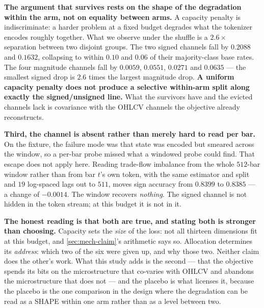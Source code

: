 \textbf{The argument that survives rests on the shape of the degradation within the arm, not on
equality between arms.} A capacity penalty is indiscriminate: a harder problem at a fixed budget
degrades what the tokenizer encodes roughly together. What we observe under the shuffle is a
$2.6\times$ separation between two disjoint groups. The two signed channels fall by $0.2088$ and
$0.1632$, collapsing to within $0.10$ and $0.06$ of their majority-class base rates. The four
magnitude channels fall by $0.0059$, $0.0551$, $0.0271$ and $0.0635$ --- the smallest signed drop
is $2.6$ times the largest magnitude drop. \textbf{A uniform capacity penalty does not produce a
selective within-arm split along exactly the signed/unsigned line.} What the survivors have and the
evicted channels lack is covariance with the OHLCV channels the objective already reconstructs.

\textbf{Third, the channel is absent rather than merely hard to read per bar.} On the fixture, the
failure mode was that state was encoded but smeared across the window, so a per-bar probe missed
what a windowed probe could find. That escape does not apply here. Reading trade-flow imbalance from
the whole $512$-bar window rather than from bar $t$'s own token, with the same estimator and split
and $19$ log-spaced lags out to $511$, moves sign accuracy from $0.8399$ to $0.8385$ --- a change of
$-0.0014$. The window recovers \emph{nothing}. The signed channel is not hidden in the token
stream; at this budget it is not in it.

\textbf{The honest reading is that both are true, and stating both is stronger than choosing.}
Capacity sets the \emph{size} of the loss: not all thirteen dimensions fit at this budget, and
\cref{sec:mech-claim}'s arithmetic says so. Allocation determines its \emph{address}: which two of
the six were given up, and why those two. Neither claim does the other's work. What this study adds
is the second --- that the objective spends its bits on the microstructure that co-varies with OHLCV
and abandons the microstructure that does not --- and the placebo is what licenses it, because the
placebo is the one comparison in the design where the degradation can be read as a SHAPE within
one arm rather than as a level between two.

